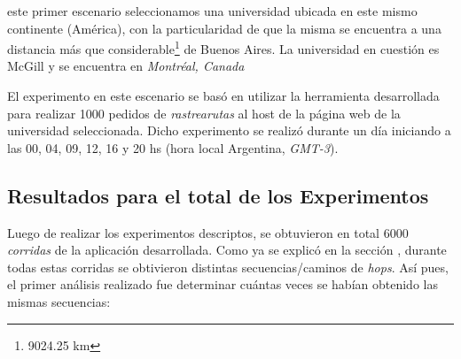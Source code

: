  este primer escenario seleccionamos una universidad ubicada
en este mismo continente (Am\'erica), con la particularidad de que la misma
se encuentra a una distancia m\'as que considerable\footnote{9024.25 km} de
Buenos Aires. La universidad en cuesti\'on es McGill\cite{mcgill} y se encuentra
en \emph{Montr\'eal, Canada}

\par El experimento en este escenario se bas\'o en utilizar la herramienta
desarrollada para realizar 1000 pedidos de \emph{rastrearutas} al host de la
p\'agina web de la universidad seleccionada. Dicho experimento se realiz\'o
durante un d\'ia iniciando a las 00, 04, 09, 12, 16 y 20 hs (hora local Argentina,
\textit{GMT-3}).

\subsection{Resultados para el total de los Experimentos}
\par Luego de realizar los experimentos descriptos, se obtuvieron en total
6000 \textit{corridas} de la aplicaci\'on desarrollada. Como ya se explic\'o
en la secci\'on \textit{}, durante todas estas corridas se
obtivieron distintas secuencias/caminos de \textit{hops}. As\'i pues,
el primer an\'alisis realizado fue determinar cu\'antas veces se hab\'ian
obtenido las mismas secuencias:

